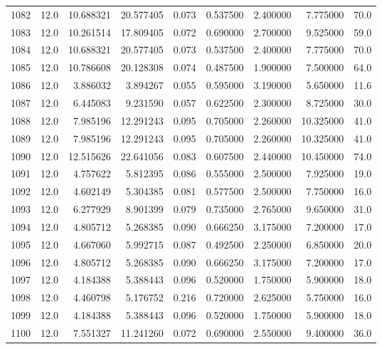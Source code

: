 \begin{tabular}{lrrrrrrrr}
1082 &   12.0 &  10.688321 &  20.577405 &  0.073 &  0.537500 &  2.400000 &   7.775000 &   70.0 \\
1083 &   12.0 &  10.261514 &  17.809405 &  0.072 &  0.690000 &  2.700000 &   9.525000 &   59.0 \\
1084 &   12.0 &  10.688321 &  20.577405 &  0.073 &  0.537500 &  2.400000 &   7.775000 &   70.0 \\
1085 &   12.0 &  10.786608 &  20.128308 &  0.074 &  0.487500 &  1.900000 &   7.500000 &   64.0 \\
1086 &   12.0 &   3.886032 &   3.894267 &  0.055 &  0.595000 &  3.190000 &   5.650000 &   11.6 \\
1087 &   12.0 &   6.445083 &   9.231590 &  0.057 &  0.622500 &  2.300000 &   8.725000 &   30.0 \\
1088 &   12.0 &   7.985196 &  12.291243 &  0.095 &  0.705000 &  2.260000 &  10.325000 &   41.0 \\
1089 &   12.0 &   7.985196 &  12.291243 &  0.095 &  0.705000 &  2.260000 &  10.325000 &   41.0 \\
1090 &   12.0 &  12.515626 &  22.641056 &  0.083 &  0.607500 &  2.440000 &  10.450000 &   74.0 \\
1091 &   12.0 &   4.757622 &   5.812395 &  0.086 &  0.555000 &  2.500000 &   7.925000 &   19.0 \\
1092 &   12.0 &   4.602149 &   5.304385 &  0.081 &  0.577500 &  2.500000 &   7.750000 &   16.0 \\
1093 &   12.0 &   6.277929 &   8.901399 &  0.079 &  0.735000 &  2.765000 &   9.650000 &   31.0 \\
1094 &   12.0 &   4.805712 &   5.268385 &  0.090 &  0.666250 &  3.175000 &   7.200000 &   17.0 \\
1095 &   12.0 &   4.667060 &   5.992715 &  0.087 &  0.492500 &  2.250000 &   6.850000 &   20.0 \\
1096 &   12.0 &   4.805712 &   5.268385 &  0.090 &  0.666250 &  3.175000 &   7.200000 &   17.0 \\
1097 &   12.0 &   4.184388 &   5.388443 &  0.096 &  0.520000 &  1.750000 &   5.900000 &   18.0 \\
1098 &   12.0 &   4.460798 &   5.176752 &  0.216 &  0.720000 &  2.625000 &   5.750000 &   16.0 \\
1099 &   12.0 &   4.184388 &   5.388443 &  0.096 &  0.520000 &  1.750000 &   5.900000 &   18.0 \\
1100 &   12.0 &   7.551327 &  11.241260 &  0.072 &  0.690000 &  2.550000 &   9.400000 &   36.0 \\

\end{tabular}
